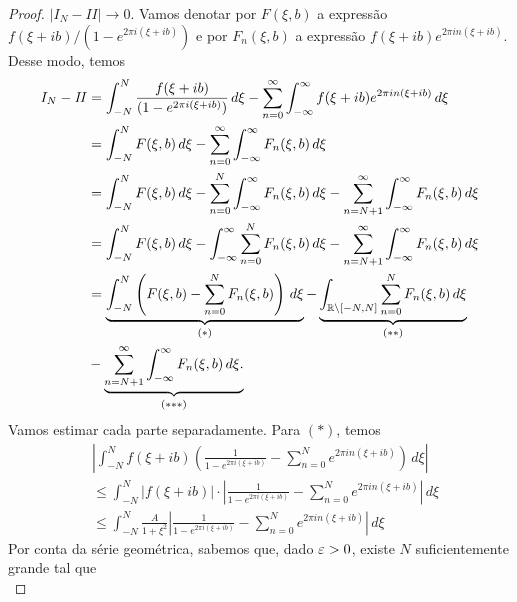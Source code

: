 \begin{proof}
        $|I_N - \mathit{II}| \to 0$. Vamos denotar por $F(\xi,b)$ a expressão 
        $f(\xi + ib)/(1 - e^{2\pi i(\xi + ib)})$ e por $F_n(\xi,b)$ a expressão 
        $f(\xi + ib)e^{2\pi in(\xi + ib)}$. Desse modo, temos
        \begin{align*}
            I_N - \mathit{II} &= \int_{-N}^{N} \frac{f(\xi + ib)}{(1 - e^{2\pi i(\xi + ib)})}
            \, d\xi - \sum_{n=0}^{\infty}\int_{-\infty}^{\infty} f(\xi + ib)
            e^{2\pi in(\xi + ib)} \, d\xi \\
            &=\int_{-N}^{N} F(\xi,b) \, d\xi -
            \sum_{n=0}^{\infty}\int_{-\infty}^{\infty}F_n(\xi,b) \, d\xi \\
            &= \int_{-N}^{N} F(\xi,b) \, d\xi - 
            \sum_{n=0}^{N}\int_{-\infty}^{\infty}F_n(\xi,b) \, d\xi - 
            \sum_{n= N+1}^{\infty}\int_{-\infty}^{\infty}F_n(\xi,b) \, d\xi\\
            &= \int_{-N}^{N} F(\xi,b) \, d\xi - \int_{-\infty}^{\infty} 
            \sum_{n=0}^{N}F_n(\xi,b) \, d\xi - 
            \sum_{n= N+1}^{\infty}\int_{-\infty}^{\infty}F_n(\xi,b) \, d\xi\\
            &= \underbrace{\int_{-N}^{N} \left(F(\xi,b) - \sum_{n=0}^{N}F_n(\xi,b) 
            \right)\, d\xi}_{(*)} - 
            \underbrace{\int_{\mathbb{R} \setminus [-N,N]}\sum_{n=0}^{N}F_n(\xi,b) 
            \, d\xi}_{(**)} \\ &- 
            \underbrace{\sum_{n= N+1}^{\infty}\int_{-\infty}^{\infty}F_n(\xi,b) 
            \, d\xi.}_{(***)}
        \end{align*}
        Vamos estimar cada parte separadamente. Para $(*)$, temos
        \begin{align*}
            &\left|\int_{-N}^{N} f(\xi + ib)\left(\frac{1}{1 - e^{2\pi i(\xi + ib)}} - \sum_{n=0}^{N}e^{2\pi i n(\xi + ib)}\right) \, d\xi \right| \\
            &\leq \int_{-N}^{N} |f(\xi + ib)|\cdot\left|\frac{1}{1 - e^{2\pi i(\xi + ib)}} - \sum_{n=0}^{N}e^{2\pi i n(\xi + ib)}\right| \, d\xi \\
            &\leq \int_{-N}^{N} \frac{A}{1 + \xi^2}\left|\frac{1}{1 - e^{2\pi i(\xi + ib)}} - \sum_{n=0}^{N}e^{2\pi i n(\xi + ib)}\right| \, d\xi 
        \end{align*}
        Por conta da série geométrica, sabemos que, dado $\varepsilon>0$, existe 
        $N$ suficientemente grande tal que
        \begin{equation*}

\end{equation*}
\end{proof}
